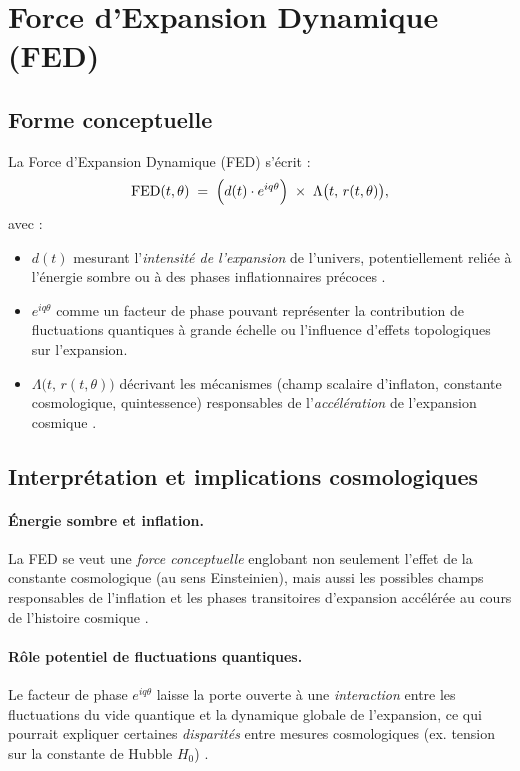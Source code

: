 \documentclass[12pt]{article}
\begin{document}
\section{Force d'Expansion Dynamique (FED)}

\subsection{Forme conceptuelle}

La Force d'Expansion Dynamique (FED) s'écrit :
\begin{equation}
\label{eq:FED}
\mathrm{FED}(t,\theta) 
\;=\; \Bigl(d(t)\cdot e^{i q \theta}\Bigr)\;\times\;\Lambda\bigl(t,\,r(t,\theta)\bigr),
\end{equation}
avec :
\begin{itemize}
    \item $d(t)$ mesurant l'\emph{intensité de l'expansion} de l'univers, 
          potentiellement reliée à l'énergie sombre ou à des phases inflationnaires 
          précoces \cite{carroll2004spacetime}.
    \item $e^{i q \theta}$ comme un facteur de phase pouvant représenter 
          la contribution de fluctuations quantiques à grande échelle ou 
          l'influence d'effets topologiques sur l'expansion.
    \item $\Lambda\bigl(t,\,r(t,\theta)\bigr)$ décrivant les mécanismes 
          (champ scalaire d'inflaton, constante cosmologique, quintessence) 
          responsables de l'\emph{accélération} de l'expansion cosmique \cite{riess1998observational}.
\end{itemize}

\subsection{Interprétation et implications cosmologiques}

\paragraph{Énergie sombre et inflation.}
La FED se veut une \emph{force conceptuelle} englobant non seulement l'effet 
de la constante cosmologique (au sens Einsteinien), mais aussi les possibles champs 
responsables de l'inflation et les phases transitoires d'expansion accélérée 
au cours de l'histoire cosmique \cite{liddle2000cosmological}.

\paragraph{Rôle potentiel de fluctuations quantiques.}
Le facteur de phase $e^{i q \theta}$ laisse la porte ouverte à une \emph{interaction} 
entre les fluctuations du vide quantique et la dynamique globale de l'expansion, 
ce qui pourrait expliquer certaines \emph{disparités} entre mesures cosmologiques 
(ex. tension sur la constante de Hubble $H_0$) \cite{planck2020parameters, riess2019large}.
\end{document}
